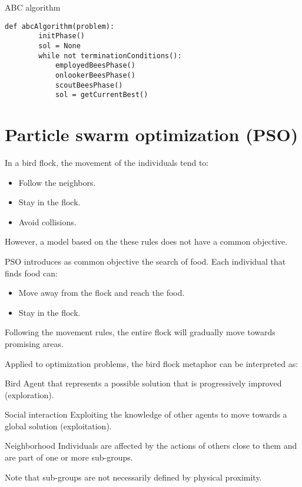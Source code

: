 \begin{algorithm}
\caption{ABC algorithm}
\begin{lstlisting}[mathescape=true]
    def abcAlgorithm(problem):
        initPhase()
        sol = None
        while not terminationConditions():
            employedBeesPhase()
            onlookerBeesPhase()
            scoutBeesPhase()
            sol = getCurrentBest()
\end{lstlisting}
\end{algorithm}



\section{Particle swarm optimization (PSO)}

In a bird flock, the movement of the individuals tend to:
\begin{itemize}
    \item Follow the neighbors.
    \item Stay in the flock.
    \item Avoid collisions.
\end{itemize}
However, a model based on the these rules does not have a common objective.

PSO introduces as common objective the search of food.
Each individual that finds food can:
\begin{itemize}
    \item Move away from the flock and reach the food.
    \item Stay in the flock.
\end{itemize}
Following the movement rules, the entire flock will gradually move towards promising areas.

Applied to optimization problems, the bird flock metaphor can be interpreted as:
\begin{descriptionlist}
    \item[Bird] 
        Agent that represents a possible solution that is progressively improved (exploration).

    \item[Social interaction] 
        Exploiting the knowledge of other agents to move towards a global solution (exploitation).

    \item[Neighborhood]
        Individuals are affected by the actions of others close to them and are part of one or more sub-groups.

        Note that sub-groups are not necessarily defined by physical proximity.
\end{descriptionlist}

